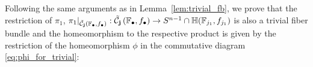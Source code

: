 \begin{remark}\label{rem:trivial_fb_interior} Following the same arguments as in Lemma~\ref{lem:trivial_fb}, we prove that the restriction of $\pi_1$, $\pi_1|_{\tilde{\mathcal{C}}_{\mathbf{j}}\left(\mathbb{F}_{\bullet},f_{\bullet}\right)}:\tilde{\mathcal{C}}_{\mathbf{j}}\left(\mathbb{F}_{\bullet},f_{\bullet}\right)\to S^{n-1}\cap\mathbb{H}(\mathbb{F}_{j_1},f_{j_1})$
is also a trivial fiber bundle and the homeomorphism to the respective product is given by the restriction of the homeomorphism $\phi$ in the commutative diagram \eqref{eq:phi_for_trivial}:
\begin{center}
\end{center}
\end{remark}

